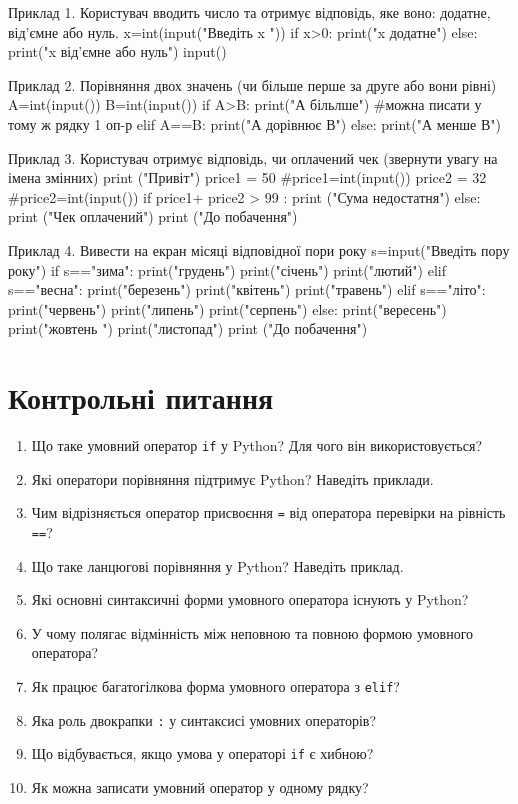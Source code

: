 \begin{py}{Приклад 1. Користувач вводить число та отримує відповідь, яке воно: додатне, від’ємне або нуль.} 
x=int(input("Введіть x "))
if x>0:
    print("x додатне")
else:
    print("x від’ємне або нуль")
    input()
\end{py}

\begin{py}{Приклад 2. Порівняння двох значень (чи більше перше за друге або вони рівні)}
A=int(input())
B=int(input())
if A>B: print("А більлше") #можна писати у тому ж рядку 1 оп-р
elif A==B: print("А дорівнює В")
else: print("А менше В")
\end{py}

\begin{py}{Приклад 3. Користувач отримує відповідь, чи оплачений чек (звернути увагу на імена змінних)}
print ("Привіт")
price1 = 50 #price1=int(input()) 
price2 = 32 #price2=int(input())
if price1+ price2 > 99 :
    print ("Сума недостатня")
else:
    print ("Чек оплачений")
    print ("До побачення")
\end{py}

\begin{py}{Приклад 4. Вивести на екран місяці відповідної пори року}
s=input("Введіть пору року")
if s=="зима":
    print("грудень")
    print("січень")
    print("лютий")
elif s=="весна":
    print("березень")
    print("квітень")
    print("травень")
elif s=="літо":
    print("червень")
    print("липень")
    print("серпень")
else:
    print("вересень")
    print("жовтень ")
    print("листопад")
print ("До побачення")
\end{py}
\section*{Контрольні питання}

\begin{enumerate}
	\item Що таке умовний оператор \texttt{if} у Python? Для чого він використовується?
	\item Які оператори порівняння підтримує Python? Наведіть приклади.
	\item Чим відрізняється оператор присвоєння \texttt{=} від оператора перевірки на рівність \texttt{==}?
	\item Що таке ланцюгові порівняння у Python? Наведіть приклад.
	\item Які основні синтаксичні форми умовного оператора існують у Python?
	\item У чому полягає відмінність між неповною та повною формою умовного оператора?
	\item Як працює багатогілкова форма умовного оператора з \texttt{elif}?
	\item Яка роль двокрапки \texttt{:} у синтаксисі умовних операторів?
	\item Що відбувається, якщо умова у операторі \texttt{if} є хибною?
	\item Як можна записати умовний оператор у одному рядку?
	
\end{enumerate}
